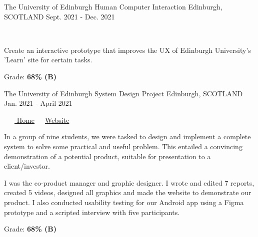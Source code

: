 \begin{cventries}
  \cventry
    {The University of Edinburgh} %
    {Human Computer Interaction} %
    {Edinburgh, SCOTLAND} %
    {Sept. 2021 - Dec. 2021} %
    {
      \color{awesome}\color{graytext}\ \ \ \href{https://www.figma.com/proto/SEoaoC4LAWCmH1iGFA4AEO/G42-CW1?node-id=0\%3A1}{\faFigma\acvHeaderIconSep{}}\ \ \ \href{https://www.figma.com/proto/Q6wnTtZs5rP21QqnWcJBP6/G42-CW3?node-id=0\%3A1}{\faFigma\acvHeaderIconSep{}}
      \vspace{1.6em}
      \begin{cvitems} %
        \item Create an interactive prototype that improves the UX of Edinburgh University's 'Learn' site for certain tasks.
        \item Grade: \textbf{68\% (B)}
      \end{cvitems}
    }
    
  \cventry
    {The University of Edinburgh} %
    {System Design Project} %
    {Edinburgh, SCOTLAND} %
    {Jan. 2021 - April 2021} %
    {
      \color{awesome}     \color{graytext}\ \ \ \href{https://github.com/DeliverED-Home}{\faGithub\acvHeaderIconSep\@DeliverED-Home}\ \ \ \href{https://DeliverED-Home.github.io/DeliverED-Site}{\faGlobe\acvHeaderIconSep\@Product Website}
      \vspace{1.6em}
      \begin{cvitems} %
        \item In a group of nine students, we were tasked to design and implement a complete system to solve some practical and useful problem. This entailed a convincing demonstration of a potential product, suitable for presentation to a client/investor.
        \item I was the co-product manager and graphic designer. I wrote and edited 7 reports, created 5 videos, designed all graphics and made the website to demonstrate our product. I also conducted usability testing for our Android app using a Figma prototype and a scripted interview with five participants.
        \item Grade: \textbf{68\% (B)}
      \end{cvitems}
    }
    

\end{cventries}
